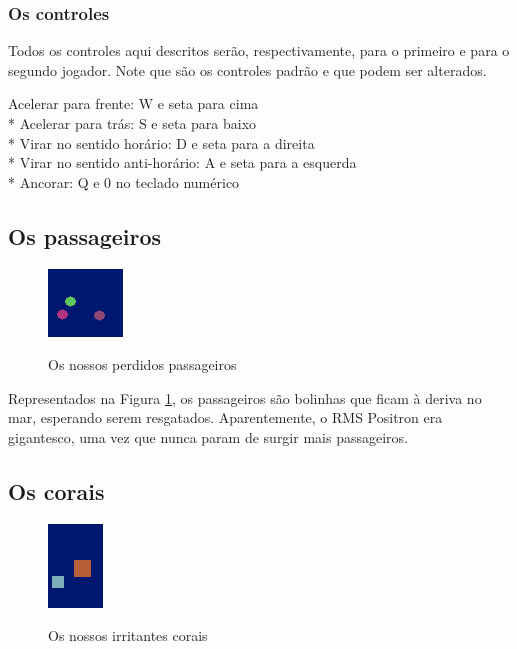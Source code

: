 \documentclass[10pt,brazil]{article}
\begin{document}
\subsubsection{Os controles}

Todos os controles aqui descritos serão, respectivamente, para o primeiro e para o segundo jogador. Note que são os
controles padrão e que podem ser alterados.

Acelerar para frente: W e seta para cima\\*
Acelerar para trás: S e seta para baixo\\*
Virar no sentido horário: D e seta para a direita\\*
Virar no sentido anti-horário: A e seta para a esquerda\\*
Ancorar: Q e 0 no teclado numérico\\

\subsection{Os passageiros}

\begin{figure}
\begin{center}
\includegraphics{people}
\label{img:people}
\caption{Os nossos perdidos passageiros}
\end{center}
\end{figure}

Representados na Figura \ref{img:people}, os passageiros são bolinhas que ficam à deriva no mar, esperando serem resgatados.
Aparentemente, o RMS Positron era gigantesco, uma vez que nunca param de surgir mais passageiros.

\subsection{Os corais}

\begin{figure}
\begin{center}
\includegraphics{corals}
\label{img:corals}
\caption{Os nossos irritantes corais}
\end{center}
\end{figure}
\end{document}

